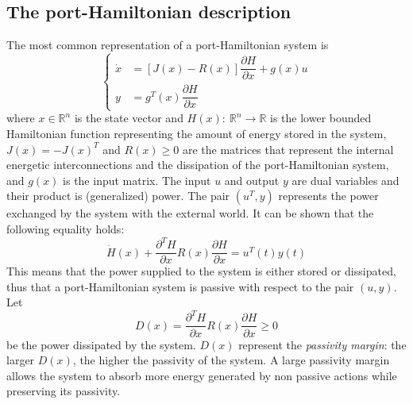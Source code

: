 \subsection{The port-Hamiltonian description}
The most common representation of a port-Hamiltonian system is
\begin{equation}\label{General_Ham_system}
	\begin{cases}
		\dot{x} &= \left[ J(x)-R(x)\right] \dfrac{\partial H}{\partial x} + g(x)u\\
		y &= g^{T}(x)  \dfrac{\partial H}{\partial x}
	\end{cases}
\end{equation}
where $x \in \mathbb{R}^{n}$ is the state vector and $H(x): \ \mathbb{R}^{n} \rightarrow \mathbb{R}$ is the lower bounded Hamiltonian function representing the amount of energy stored in the system, $J(x) = -J(x)^{T}$ and $R(x) \geq 0$ are the matrices that represent the internal energetic interconnections and the dissipation of the port-Hamiltonian system, and $g(x)$ is the input matrix.
The input $u$ and output $y$ are dual variables and their product is (generalized) power.
The pair $(u^{T},y)$ represents the power exchanged by the system with the external world.
It can be shown that the following equality holds:
\begin{equation}
	\dot{H}(x) + \dfrac{\partial^{T} H}{\partial x}R(x) \dfrac{\partial H}{\partial x} = u^{T}(t)y(t)
\end{equation}
This means that the power supplied to the system is either stored or dissipated, thus that a port-Hamiltonian system is passive with respect to the pair $(u,y)$.\\
Let
\begin{equation}
	D(x) =  \dfrac{\partial^{T} H}{\partial x}R(x) \dfrac{\partial H}{\partial x} \geq 0
\end{equation}
be the power dissipated by the system. $D(x)$ represent the \textit{passivity margin}: the larger $D(x)$, the higher the passivity of the system.
A large passivity margin allows the system to absorb more energy generated by non passive actions while preserving its passivity.

